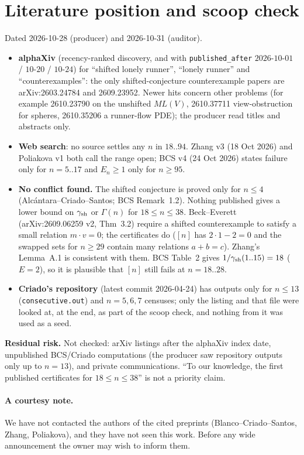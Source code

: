 \documentclass[10pt]{article}
\begin{document}
\section{Literature position and scoop check}\label{sec:scoop}
Dated 2026-10-28 (producer) and 2026-10-31 (auditor).
\begin{itemize}\itemsep=0pt
\item \textbf{alphaXiv} (recency-ranked discovery, and with \texttt{published\_after} $2026$-$10$-$01$ / $10$-$20$ / $10$-$24$) for ``shifted lonely runner'', ``lonely runner'' and ``counterexamples'': the only shifted-conjecture counterexample papers are arXiv:2603.24784 and 2609.23952. Newer hits concern other problems (for example 2610.23790 on the unshifted $ML(V)$, 2610.37711 view-obstruction for spheres, 2610.35206 a runner-flow PDE); the producer read titles and abstracts only.
\item \textbf{Web search}: no source settles any $n$ in $18..94$. Zhang v3 (18 Oct 2026) and Poliakova v1 both call the range open; BCS v4 (24 Oct 2026) states failure only for $n=5..17$ and $E_n\ge1$ only for $n\ge95$.
\item \textbf{No conflict found.} The shifted conjecture is proved only for $n\le4$ (Alc\'antara--Criado--Santos; BCS Remark~1.2). Nothing published gives a lower bound on $\gamma_{\rm sh}$ or $\Gamma(n)$ for $18\le n\le38$. Beck--Everett (arXiv:2609.06259 v2, Thm~3.2) require a shifted counterexample to satisfy a small relation $m\cdot v=0$; the certificates do ($[n]$ has $2\cdot1-2=0$ and the swapped sets for $n\ge29$ contain many relations $a+b=c$). Zhang's Lemma~A.1 is consistent with them. BCS Table~2 gives $1/\gamma_{\rm sh}(1..15)=18$ ($E=2$), so it is plausible that $[n]$ still fails at $n=18..28$.
\item \textbf{Criado's repository} (latest commit 2026-04-24) has outputs only for $n\le13$ (\texttt{consecutive.out}) and $n=5,6,7$ censuses; only the listing and that file were looked at, at the end, as part of the scoop check, and nothing from it was used as a seed.
\end{itemize}
\textbf{Residual risk.} Not checked: arXiv listings after the alphaXiv index date, unpublished BCS/Criado computations (the producer saw repository outputs only up to $n=13$), and private communications. ``To our knowledge, the first published certificates for $18\le n\le38$'' is not a priority claim.
\paragraph{A courtesy note.} We have not contacted the authors of the cited preprints (Blanco--Criado--Santos, Zhang, Poliakova), and they have not seen this work. Before any wide announcement the owner may wish to inform them.
\end{document}
